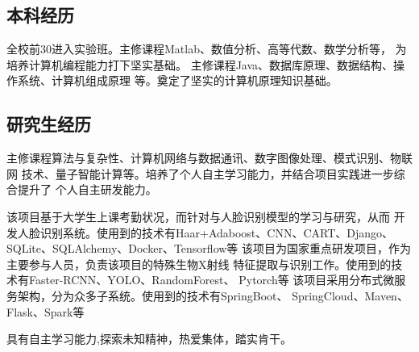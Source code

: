 \documentclass[
  a4paper, 11pt
]{MyStyle}
\begin{document}
\makefrontsidebar


    \subsection{本科经历}
    \begin{cvtable}
        \cvitem{}{}{}{}
            {全校前30进入实验班。主修课程Matlab、数值分析、高等代数、数学分析等，           为培养计算机编程能力打下坚实基础。}
            {主修课程Java、数据库原理、数据结构、操作系统、计算机组成原理
            等。奠定了坚实的计算机原理知识基础。}
    \end{cvtable}

    \subsection{研究生经历}
    \begin{cvtable}
            {主修课程算法与复杂性、计算机网络与数据通讯、数字图像处理、模式识别、物联网
            技术、量子智能计算等。培养了个人自主学习能力，并结合项目实践进一步综合提升了
            个人自主研发能力。}
    \end{cvtable}

    \begin{cvtable}
            {该项目基于大学生上课考勤状况，而针对与人脸识别模型的学习与研究，从而
            开发人脸识别系统。使用到的技术有Haar+Adaboost、CNN、CART、Django、
            SQLite、SQLAlchemy、Docker、Tensorflow等}
            {该项目为国家重点研发项目，作为主要参与人员，负责该项目的特殊生物X射线
            特征提取与识别工作。使用到的技术有Faster-RCNN、YOLO、RandomForest、
            Pytorch等}
            {该项目采用分布式微服务架构，分为众多子系统。使用到的技术有SpringBoot、
            SpringCloud、Maven、Flask、Spark等}
    \end{cvtable}

    \begin{cvtable}
    \end{cvtable}

    {具有自主学习能力,探索未知精神，热爱集体，踏实肯干。}
\end{document}
